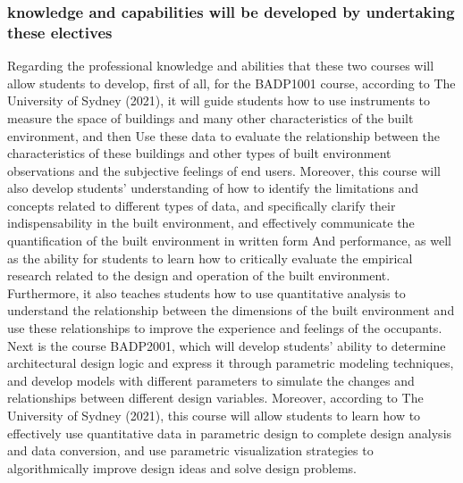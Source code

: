 \documentclass[../draft.tex]{subfiles}
\begin{document}
\subsubsection{knowledge and capabilities will be developed by undertaking these electives} 
Regarding the professional knowledge and abilities that these two courses will allow students to develop, first of all, for the BADP1001 course, according to The University of Sydney (2021), it will guide students how to use instruments to measure the space of buildings and many other characteristics of the built environment, and then Use these data to evaluate the relationship between the characteristics of these buildings and other types of built environment observations and the subjective feelings of end users. Moreover, this course will also develop students' understanding of how to identify the limitations and concepts related to different types of data, and specifically clarify their indispensability in the built environment, and effectively communicate the quantification of the built environment in written form And performance, as well as the ability for students to learn how to critically evaluate the empirical research related to the design and operation of the built environment. Furthermore, it also teaches students how to use quantitative analysis to understand the relationship between the dimensions of the built environment and use these relationships to improve the experience and feelings of the occupants. Next is the course BADP2001, which will develop students' ability to determine architectural design logic and express it through parametric modeling techniques, and develop models with different parameters to simulate the changes and relationships between different design variables. Moreover, according to The University of Sydney (2021), this course will allow students to learn how to effectively use quantitative data in parametric design to complete design analysis and data conversion, and use parametric visualization strategies to algorithmically improve design ideas and solve design problems.
\end{document}
